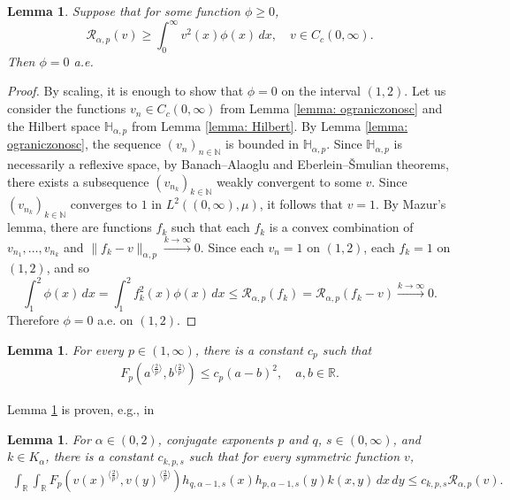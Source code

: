 \documentclass[12pt, a4paper]{amsart}
\newtheorem{lemma}[theorem]{Lemma}
\newcommand{\R}{\mathbb{R}}
\newcommand{\RR}{\mathcal{R}}
\begin{document}
\begin{lemma}
\label{lemma: critical weight of remainder}
    Suppose that for some function $\phi \geq 0$, 
          \[
           \RR_{\alpha, p}(v) \geq \int_0^\infty v^2(x) \phi(x)\,dx , \quad v\in C_c(0,\infty).
          \]
          Then $\phi=0$ a.e.
\end{lemma}
\begin{proof}
          By scaling, it is enough to show that $\phi=0$ on the interval $(1,2)$.
          Let us consider the functions $v_n\in C_c(0,\infty)$ from Lemma \cref{lemma: ograniczonosc} and the Hilbert space $\mathbb{H}_{\alpha, p}$ from Lemma \cref{lemma: Hilbert}.
          By Lemma \ref{lemma: ograniczonosc}, the sequence $(v_n)_{n \in \mathbb{N}}$ is bounded in $\mathbb{H}_{\alpha, p}$. Since $\mathbb{H}_{\alpha, p}$ 
          is necessarily a reflexive space,
          by Banach--Alaoglu and Eberlein--\v{S}mulian theorems,
          there exists a subsequence $(v_{n_{k}})_{k\in\mathbb{N}}$ weakly convergent to some $v$.
          Since $(v_{n_{k}})_{k\in\mathbb{N}}$ converges to $1$ in $L^2((0,\infty), \mu)$,
          it follows that $v = 1$.
          By Mazur's lemma, there are functions $f_k$ such that each $f_k$ is a convex combination
          of $v_{n_1}, \ldots, v_{n_k}$ and  $\| f_k - v\|_{\alpha, p} \xrightarrow[]{k \rightarrow\infty} 0$. Since each $v_n=1$ on $(1,2)$,
          each $f_k=1$ on $(1,2)$, and so
          \[
          \int_1^2 \phi(x)\,dx =
          \int_1^2 f_k^2(x)\phi(x)\,dx \leq
          \RR_{\alpha, p}(f_k) = \RR_{\alpha, p}(f_k - v) \xrightarrow[]{k\rightarrow\infty} 0.
          \]
          Therefore $\phi=0$ a.e. on $(1,2)$.
\end{proof}

\begin{lemma}
\label{lemma: comparability}
For every $p \in (1, \infty)$, there is a constant $c_p$ such that
\begin{align*}
    F_p\left(a^{\langle \frac{2}{p} \rangle}, b^{\langle \frac{2}{p} \rangle}\right) \leq c_p(a - b)^2, \quad a, b \in \R.
\end{align*}
\end{lemma}

Lemma \cref{lemma: comparability} is proven, e.g., in \cite[Lemma 2.3.]{MR4589708}

\begin{lemma}
\label{lemma: pfrom R comparison}
For $\alpha \in (0, 2)$, conjugate exponents $p$ and $q$, $s \in (0, \infty)$, and $k \in K_\alpha$, there is a constant $c_{k, p, s}$ such that for every symmetric function $v$,
\begin{align*}
    \int_{\R}\int_{\R}F_p \left(v(x)^{\langle \frac{2}{p} \rangle}, v(y)^{\langle \frac{2}{p} \rangle}\right) h_{q, \alpha-1, s}(x)h_{p, \alpha-1, s}(y) k(x, y)\,dx\,dy \leq c_{k, p, s}\RR_{\alpha, p}(v).
\end{align*}
\end{lemma}
\end{document}
